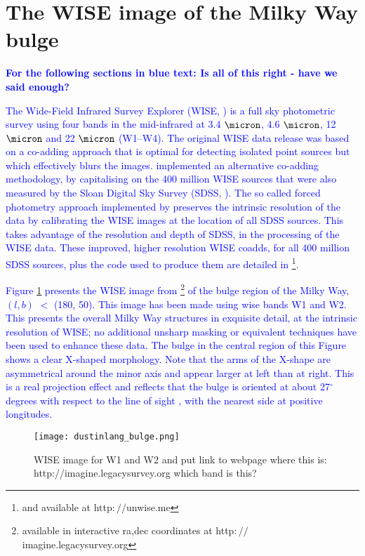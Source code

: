 \documentclass[12pt, preprint]{aastex}
\begin{document}
\section{The WISE image of the Milky Way bulge}

\textcolor{blue}{\textbf{For the following sections in blue text: Is all of this right - have we said enough?} }

\textcolor{blue}{The Wide-Field Infrared Survey Explorer (WISE, \citet{W2010}) is a full sky photometric survey using four bands in the mid-infrared at 3.4 $\micron$, 4.6 $\micron$, 12 $\micron$ and 22 $\micron$ (W1--W4). The original WISE data release was based on a co-adding approach that is optimal for detecting isolated point sources but which effectively blurs the images. \citet{Lang2014b} implemented an alternative co-adding methodology, by capitalising on the 400 million WISE sources that were also measured by the Sloan Digital Sky Survey (SDSS, \citet{York2000}). The so called forced photometry approach implemented by \citet{Lang2014a} preserves the intrinsic resolution of the data by calibrating the WISE images at the location of all SDSS sources. This takes advantage of the resolution and depth of SDSS, in the processing of the WISE data. These improved, higher resolution WISE coadds, for all 400 million SDSS sources, plus the code used to produce them are detailed in \citet{Lang2014b}} \footnote{and available at http$://$unwise.me}.

\textcolor{blue}{Figure \ref{fig:xbulge} presents the WISE image from \citet{Lang2014a} \footnote{available in interactive ra,dec coordinates at http$://$imagine.legacysurvey.org} of the bulge region of the Milky Way, $(l,b)$ $<$ (180, 50). This image has been made using wise bands W1 and W2. This presents the overall Milky Way structures in exquisite detail, at the intrinsic resolution of WISE; no additional unsharp masking or equivalent techniques have been used to enhance these data. The bulge in the central region of this Figure shows a clear X-shaped morphology. Note that the arms of the X-shape are asymmetrical around the minor axis and appear larger at left than at right. This is a real projection effect and reflects that the bulge is oriented at about 27$^\circ$ degrees with respect to the line of sight \citep{Wegg2013}, with the nearest side at positive longitudes.}


\begin{figure}[h!]
\centering
        \texttt{[image: dustinlang\_bulge.png]}
\caption{WISE image for W1 and W2 and put link to webpage where this is: http://imagine.legacysurvey.org which band is this? }
\label{fig:xbulge}
\end{figure}
\end{document}
